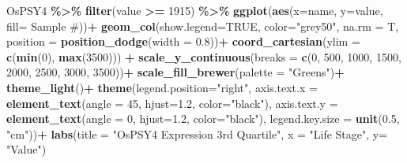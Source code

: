 \documentclass[
]{article}
\newenvironment{Shaded}{\begin{snugshade}}{\end{snugshade}}
\newcommand{\AttributeTok}[1]{\textcolor[rgb]{0.13,0.29,0.53}{#1}}
\newcommand{\ConstantTok}[1]{\textcolor[rgb]{0.56,0.35,0.01}{#1}}
\newcommand{\DecValTok}[1]{\textcolor[rgb]{0.00,0.00,0.81}{#1}}
\newcommand{\FloatTok}[1]{\textcolor[rgb]{0.00,0.00,0.81}{#1}}
\newcommand{\FunctionTok}[1]{\textcolor[rgb]{0.13,0.29,0.53}{\textbf{#1}}}
\newcommand{\NormalTok}[1]{#1}
\newcommand{\SpecialCharTok}[1]{\textcolor[rgb]{0.81,0.36,0.00}{\textbf{#1}}}
\newcommand{\StringTok}[1]{\textcolor[rgb]{0.31,0.60,0.02}{#1}}
\begin{document}
\begin{Shaded}
\begin{Highlighting}[]
\NormalTok{OsPSY4 }\SpecialCharTok{\%\textgreater{}\%} 
  \FunctionTok{filter}\NormalTok{(value }\SpecialCharTok{\textgreater{}=} \DecValTok{1915}\NormalTok{) }\SpecialCharTok{\%\textgreater{}\%} 
  \FunctionTok{ggplot}\NormalTok{(}\FunctionTok{aes}\NormalTok{(}\AttributeTok{x=}\NormalTok{name, }\AttributeTok{y=}\NormalTok{value, }\AttributeTok{fill=} \StringTok{\textasciigrave{}}\AttributeTok{Sample \#}\StringTok{\textasciigrave{}}\NormalTok{))}\SpecialCharTok{+}
  \FunctionTok{geom\_col}\NormalTok{(}\AttributeTok{show.legend=}\ConstantTok{TRUE}\NormalTok{, }\AttributeTok{color=}\StringTok{"grey50"}\NormalTok{, }\AttributeTok{na.rm =}\NormalTok{ T, }\AttributeTok{position =} \FunctionTok{position\_dodge}\NormalTok{(}\AttributeTok{width =} \FloatTok{0.8}\NormalTok{))}\SpecialCharTok{+}
  \FunctionTok{coord\_cartesian}\NormalTok{(}\AttributeTok{ylim =} \FunctionTok{c}\NormalTok{(}\FunctionTok{min}\NormalTok{(}\DecValTok{0}\NormalTok{), }\FunctionTok{max}\NormalTok{(}\DecValTok{3500}\NormalTok{))) }\SpecialCharTok{+}
  \FunctionTok{scale\_y\_continuous}\NormalTok{(}\AttributeTok{breaks =} \FunctionTok{c}\NormalTok{(}\DecValTok{0}\NormalTok{, }\DecValTok{500}\NormalTok{, }\DecValTok{1000}\NormalTok{, }\DecValTok{1500}\NormalTok{, }\DecValTok{2000}\NormalTok{, }\DecValTok{2500}\NormalTok{, }\DecValTok{3000}\NormalTok{, }\DecValTok{3500}\NormalTok{))}\SpecialCharTok{+}
  \FunctionTok{scale\_fill\_brewer}\NormalTok{(}\AttributeTok{palette =} \StringTok{"Greens"}\NormalTok{)}\SpecialCharTok{+}
  \FunctionTok{theme\_light}\NormalTok{()}\SpecialCharTok{+}
  \FunctionTok{theme}\NormalTok{(}\AttributeTok{legend.position=}\StringTok{"right"}\NormalTok{, }
        \AttributeTok{axis.text.x =} \FunctionTok{element\_text}\NormalTok{(}\AttributeTok{angle =} \DecValTok{45}\NormalTok{, }\AttributeTok{hjust=}\FloatTok{1.2}\NormalTok{, }\AttributeTok{color=}\StringTok{"black"}\NormalTok{), }
        \AttributeTok{axis.text.y =} \FunctionTok{element\_text}\NormalTok{(}\AttributeTok{angle =} \DecValTok{0}\NormalTok{, }\AttributeTok{hjust=}\FloatTok{1.2}\NormalTok{, }\AttributeTok{color=}\StringTok{"black"}\NormalTok{), }
        \AttributeTok{legend.key.size =} \FunctionTok{unit}\NormalTok{(}\FloatTok{0.5}\NormalTok{, }\StringTok{"cm"}\NormalTok{))}\SpecialCharTok{+}
  \FunctionTok{labs}\NormalTok{(}\AttributeTok{title =} \StringTok{"OsPSY4 Expression 3rd Quartile"}\NormalTok{,}
       \AttributeTok{x =} \StringTok{"Life Stage"}\NormalTok{,}
       \AttributeTok{y=} \StringTok{"Value"}\NormalTok{)}
\end{Highlighting}
\end{Shaded}
\end{document}
